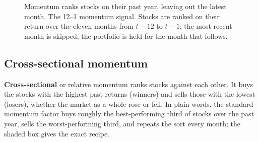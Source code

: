 \begin{figure}[htbp]
\centering
{}
\caption{Momentum ranks stocks on their past year, leaving out the latest month. The 12--1 momentum signal. Stocks are ranked on their return over the eleven months from $t-12$ to $t-1$; the most recent month is skipped; the portfolio is held for the month that follows.}
\label{fig:05-signal}
\end{figure}

\subsection{Cross-sectional momentum}


\textbf{Cross-sectional} or relative momentum ranks stocks against each other. It buys the stocks with the highest past returns (winners) and sells those with the lowest (losers), whether the market as a whole rose or fell. In plain words, the standard momentum factor buys roughly the best-performing third of stocks over the past year, sells the worst-performing third, and repeats the sort every month; the shaded box gives the exact recipe.

